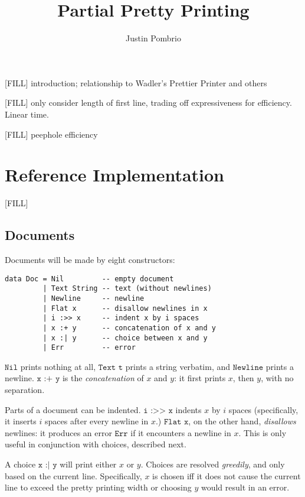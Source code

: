 \documentclass{article}
\newcommand{\ind}[2]{\texttt{#1 :>> #2}}
\newcommand{\cat}[2]{\texttt{#1 :+ #2}}
\newcommand{\choice}[2]{\texttt{#1 :| #2}}
\newcommand{\txt}[1]{\texttt{Text #1}}
\newcommand{\nil}{\texttt{Nil}}
\newcommand{\err}{\texttt{Err}}
\newcommand{\nl}{\texttt{Newline}}
\renewcommand{\flat}[1]{\texttt{Flat #1}}
\begin{document}
\author{Justin Pombrio}
\title{Partial Pretty Printing}
\maketitle

[FILL] introduction; relationship to Wadler's Prettier Printer and others

[FILL] only consider length of first line, trading off expressiveness for efficiency. Linear time.

[FILL] peephole efficiency

\section{Reference Implementation}

[FILL]

\subsection{Documents}

Documents will be made by eight constructors:

\begin{lstlisting}
data Doc = Nil         -- empty document
         | Text String -- text (without newlines)
         | Newline     -- newline
         | Flat x      -- disallow newlines in x
         | i :>> x     -- indent x by i spaces
         | x :+ y      -- concatenation of x and y
         | x :| y      -- choice between x and y
         | Err         -- error
\end{lstlisting}

$\nil$ prints nothing at all, $\txt{t}$ prints a string verbatim, and $\nl$ prints a newline.
$\cat{x}{y}$ is the \emph{concatenation} of $x$ and $y$: it first prints $x$, then $y$, with no
separation.

Parts of a document can be indented. $\ind{i}{x}$ indents $x$ by $i$ spaces (specifically, it
inserts $i$ spaces after every newline in $x$.) $\flat{x}$, on the other hand, \emph{disallows}
newlines: it produces an error $\err$ if it encounters a newline in $x$. This is only useful in
conjunction with choices, described next.

A choice $\choice{x}{y}$ will print either $x$ or $y$. Choices are resolved \emph{greedily}, and
only based on the current line. Specifically, $x$ is chosen iff it does not cause the current line
to exceed the pretty printing width or choosing $y$ would result in an error.
\end{document}
